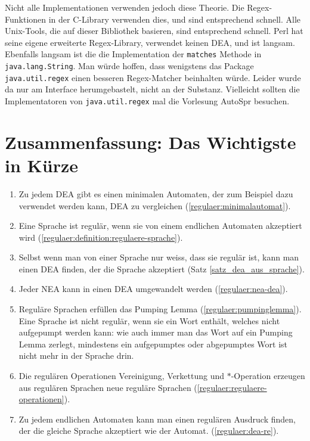\begin{sloppypar} %
Nicht alle Implementationen verwenden jedoch diese Theorie.
Die Regex-Funktionen in der C-Library verwenden dies, und sind entsprechend
schnell.
Alle Unix-Tools, die auf dieser Bibliothek basieren, sind
entsprechend schnell.
Perl hat seine eigene erweiterte Regex-Library,
verwendet keinen DEA, und ist langsam.
Ebenfalls langsam ist die
die Implementation der {\tt matches} Methode in {\tt java.lang.String}.
Man würde hoffen, dass wenigstens das Package {\tt java.util.regex} einen
besseren Regex-Matcher beinhalten würde.
Leider wurde da nur am Interface herumgebastelt, nicht an der Substanz.
Vielleicht sollten
die Implementatoren von {\tt java.util.regex} mal die Vorlesung AutoSpr
besuchen.
\end{sloppypar}

\section{Zusammenfassung: Das Wichtigste in Kürze}
\begin{enumerate}
\item Zu jedem DEA gibt es einen
minimalen Automaten, der zum Beispiel dazu verwendet werden kann,
DEA zu vergleichen
(\ref{regulaer:minimalautomat}).
\item Eine Sprache ist regulär, wenn sie von einem endlichen Automaten
akzeptiert wird (\ref{regulaer:definition:regulaere-sprache}).
\item Selbst wenn man von einer Sprache nur weiss, dass sie regulär
ist, kann man einen DEA finden, der die Sprache akzeptiert
(Satz \ref{satz_dea_aus_sprache}).
\item Jeder NEA kann in einen DEA umgewandelt werden (\ref{regulaer:nea-dea}).
\item Reguläre Sprachen erfüllen das Pumping Lemma
(\ref{regulaer:pumpinglemma}).
Eine Sprache ist nicht regulär, wenn sie ein Wort enthält, welches
nicht aufgepumpt werden kann: wie auch immer man das Wort
auf ein Pumping Lemma zerlegt, mindestens ein aufgepumptes
oder abgepumptes Wort ist nicht mehr in der Sprache drin.
\item Die regulären Operationen Vereinigung, Verkettung und $*$-Operation
erzeugen aus regulären Sprachen neue reguläre Sprachen
(\ref{regulaer:regulaere-operationen}).
\item Zu jedem endlichen Automaten kann man einen regulären Ausdruck
finden, der die gleiche Sprache akzeptiert wie der Automat.
(\ref{regulaer:dea-re}).
\end{enumerate}
